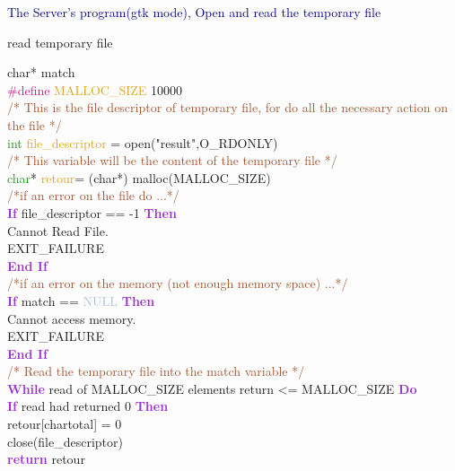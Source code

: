 \documentclass[11pt]{sample}
\renewcommand{\algorithmicwhile}   {\textcolor{DarkOrchid}{\textbf{While}}}
\renewcommand{\algorithmicdo}      {\textcolor{DarkOrchid}{\textbf{Do}}}
\renewcommand{\algorithmicif}      {\textbf{\textcolor{DarkOrchid}{If}}}
\renewcommand{\algorithmicendif}   {\textcolor{DarkOrchid}{\textbf{End If}}}
\renewcommand{\algorithmicthen}    {\textcolor{DarkOrchid}{\textbf{Then}}}
\renewcommand{\algorithmicdo}      {\textbf{\textcolor{DarkOrchid}{Do}}}
\renewcommand{\algorithmicreturn}  {\textbf{\textcolor{DarkOrchid}{return}}}
\begin{document}
\newpage
\textcolor{Navy}{The Server's program(gtk mode), Open and read the temporary file }
\begin{algorithm}
  \caption{read temporary file}
  \begin{algorithmic}
    \ENSURE char* match\\
    \textcolor{MediumVioletRed}{\#define }\textcolor{Goldenrod}{MALLOC\_SIZE } 10000\\
    \textcolor{Sienna}{  /* This is the file descriptor of temporary file, for do all the necessary action on the file */}\\
    \textcolor{ForestGreen}{int} \textcolor{Goldenrod}{file\_descriptor} = open("result",O\_RDONLY)\\
    \textcolor{Sienna}{  /* This variable will be the content of the temporary file */}\\
    \textcolor{ForestGreen}{char}* \textcolor{Goldenrod}{retour}= (char*) malloc(MALLOC\_SIZE) \\
    \textcolor{Sienna}{ /*if an error on the file do ...*/ }\\
    \algorithmicif{ file\_descriptor == -1} \algorithmicthen \\
    Cannot Read File.\\
    EXIT\_FAILURE\\
    \algorithmicendif\\
    \textcolor{Sienna}{ /*if an error on the memory (not enough memory space) ...*/ }\\
    \algorithmicif{ match == \textcolor{LightSteelBlue}{NULL}} \algorithmicthen \\
    Cannot access memory.\\
    EXIT\_FAILURE\\
    \algorithmicendif\\
    \textcolor{Sienna}{ /* Read the temporary file into the match variable */ }\\
    \algorithmicwhile{ read of MALLOC\_SIZE elements return <= MALLOC\_SIZE }\algorithmicdo\\
    \hspace{4mm}\algorithmicif{ read had returned 0} \algorithmicthen\\
    \hspace{8mm}retour[chartotal] = 0\\
    \hspace{8mm}close(file\_descriptor)\\
    \hspace{8mm}\algorithmicreturn{ retour}\\

\end{algorithmic}
\end{algorithm}
\end{document}

